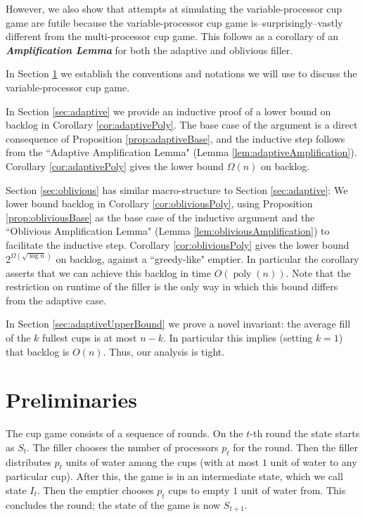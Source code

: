 \documentclass[twocolumn]{article}[11pt]
\newcommand{\defn}[1]{{\textit{\textbf{\boldmath #1}}}}
\renewcommand{\paragraph}[1]{\vspace{0.09in}\noindent{\bf \boldmath #1.}}
\DeclareMathOperator{\poly}{\text{poly}}
\begin{document}
However, we also show that attempts at simulating the variable-processor cup
game are futile because the variable-processor cup game
is--surprisingly--vastly different from the multi-processor cup game. This
follows as a corollary of an \defn{Amplification Lemma} for both the adaptive and oblivious filler.

\paragraph{Outline and Results}
In Section \ref{sec:prelims} we establish the conventions and notations we will
use to discuss the variable-processor cup game. 

In Section \ref{sec:adaptive} we provide an inductive
proof of a lower bound on backlog in Corollary \ref{cor:adaptivePoly}.
The base case of the argument is a direct consequence of Proposition
\ref{prop:adaptiveBase}, and the inductive step follows from the ``Adaptive
Amplification Lemma" (Lemma \ref{lem:adaptiveAmplification}). Corollary \ref{cor:adaptivePoly}
gives the lower bound $\Omega(n)$ on backlog.

Section \ref{sec:oblivious} has similar macro-structure to Section
\ref{sec:adaptive}: We lower bound backlog in
Corollary \ref{cor:obliviousPoly}, using Proposition \ref{prop:obliviousBase}
as the base case of the inductive argument and the ``Oblivious Amplification Lemma" (Lemma
\ref{lem:obliviousAmplification}) to facilitate the inductive step. Corollary
\ref{cor:obliviousPoly} gives the lower bound $2^{\Omega(\sqrt{\log n})}$ on
backlog, against a ``greedy-like" emptier. In particular the corollary asserts
that we can achieve this backlog in time $O(\poly(n))$. Note that the
restriction on runtime of the filler is the only way in which this bound
differs from the adaptive case.

In Section \ref{sec:adaptiveUpperBound} we prove a novel invariant: the average
fill of the $k$ fullest cups is at most $n-k$. In particular this implies
(setting $k=1$) that backlog is $O(n)$. Thus, our analysis is tight.

\section{Preliminaries}\label{sec:prelims}
The cup game consists of a sequence of rounds. On the $t$-th round the state
starts as $S_t$. The filler chooses the number of processors $p_t$ for the round. 
Then the filler distributes $p_t$ units of water among the cups (with at most
$1$ unit of water to any particular cup). After this, the game is in an intermediate
state, which we call state $I_t$. Then the emptier chooses
$p_t$ cups to empty $1$ unit of water from. This concludes the round; the state of the game is now $S_{t+1}$.
\end{document}
